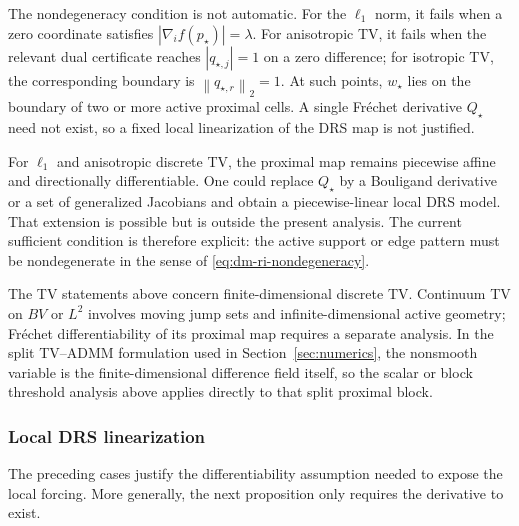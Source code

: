 \documentclass[10pt,leqno]{amsart}
\numberwithin{equation}{section}
\numberwithin{algorithm}{section}
\theoremstyle{remark}
\newcommand{\norm}[1]{\left\lVert #1 \right\rVert}
\newcommand{\grad}{\nabla}
\begin{document}
The nondegeneracy condition is not automatic.  For the \(\ell_1\) norm, it fails when a zero coordinate satisfies
\(
 |\grad_i f(p_\star)|=\lambda
\).  For anisotropic TV, it fails when the relevant dual certificate reaches
\(
 |q_{\star,j}|=1
\)
on a zero difference; for isotropic TV, the corresponding boundary is
\(
 \norm{q_{\star,r}}_2=1
\).  At such points, \(w_\star\) lies on the boundary of two or more active proximal cells.  A single Fr\'echet derivative \(Q_\star\) need not exist, so a fixed local linearization of the DRS map is not justified.

For \(\ell_1\) and anisotropic discrete TV, the proximal map remains piecewise affine and directionally differentiable.  One could replace \(Q_\star\) by a Bouligand derivative or a set of generalized Jacobians and obtain a piecewise-linear local DRS model.  That extension is possible but is outside the present analysis.  The current sufficient condition is therefore explicit: the active support or edge pattern must be nondegenerate in the sense of \eqref{eq:dm-ri-nondegeneracy}.

The TV statements above concern finite-dimensional discrete TV.  Continuum TV on \(BV\) or \(L^2\) involves moving jump sets and infinite-dimensional active geometry; Fr\'echet differentiability of its proximal map requires a separate analysis.  In the split TV--ADMM formulation used in Section~\ref{sec:numerics}, the nonsmooth variable is the finite-dimensional difference field itself, so the scalar or block threshold analysis above applies directly to that split proximal block.

\subsubsection{Local DRS linearization}

The preceding cases justify the differentiability assumption needed to expose the local forcing.  More generally, the next proposition only requires the derivative to exist.
\end{document}
